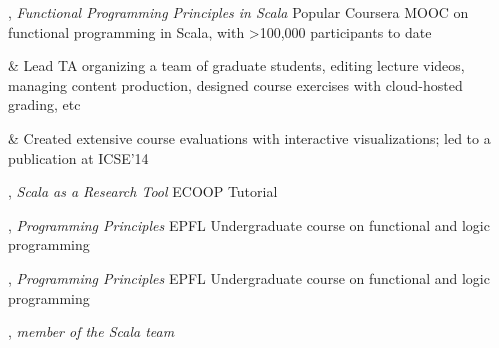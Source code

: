 \documentclass[9pt]{article}
\begin{document}
\bigskip

\medskip
{}

, {\em Functional Programming Principles in Scala} 
\newline\noindent Popular Coursera MOOC on functional programming in Scala,
\newline\noindent with >100,000 participants to date
\vspace{0.05in}
\begin{easylist}[itemize]
& Lead TA organizing a team of graduate students, editing lecture videos, managing content production, designed course exercises with cloud-hosted grading, etc

& Created extensive course evaluations with interactive visualizations; led to a publication at ICSE'14
\end{easylist}
\medskip

, {\em Scala as a Research Tool} 
\newline\noindent ECOOP Tutorial
\medskip

, {\em Programming Principles} 
\newline\noindent EPFL Undergraduate course on functional and logic programming
\medskip

, {\em Programming Principles} 
\newline\noindent EPFL Undergraduate course on functional and logic programming

\bigskip

\medskip
{}

, {\em member of the Scala team} 
\end{document}
